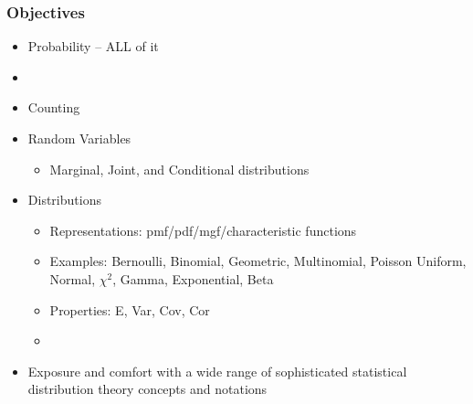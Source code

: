 \documentclass[xcolor={dvipsnames}]{beamer}
\begin{document}
\frame
{
\normalsize
 \frametitle{Objectives}
\begin{itemize}
\item Probability -- ALL of it
\item[] 
\item<2-> Counting
\item<2-> Random Variables
\begin{itemize}
\item<2-> Marginal, Joint, and Conditional distributions
\end{itemize}
\item<2-> Distributions
\begin{itemize}
\item<2-> Representations: pmf/pdf/mgf/characteristic functions
\item<2-> Examples: Bernoulli, Binomial, Geometric, Multinomial, Poisson 
Uniform, Normal, $\chi^2$, Gamma, Exponential, Beta 
\item<2-> Properties: E, Var, Cov, Cor 
\item[] 
\end{itemize}
\item<3-> Exposure and comfort with a wide range of sophisticated statistical distribution theory concepts and notations

\end{itemize}

}
\end{document}
